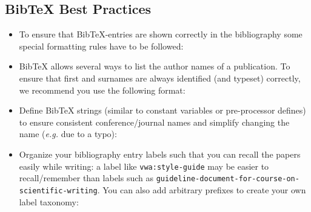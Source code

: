\documentclass[11pt,a4paper]{article}
\begin{document}

\subsection{BibTeX Best Practices}
\label{sec-bibtex-extras}


\begin{itemize}

\item To ensure that BibTeX-entries are shown correctly in the bibliography some
special formatting rules have to be followed:
\vspace{-0.6cm}

\item BibTeX allows several ways to list the author names of a publication.
To ensure that first and surnames are always identified (and typeset) correctly, we recommend you use the following format:
\vspace{-0.6cm}

\item Define BibTeX strings (similar to constant variables or pre-processor defines) to ensure consistent conference/journal names and simplify changing the name (\emph{e.g.} due to a typo):
%
\vspace{-0.6cm}

\item Organize your bibliography entry labels such that you can recall the papers easily while writing: a label like \texttt{vwa:style-guide} may be easier to recall/remember than labels such as \texttt{guideline-document-for-course-on-scientific-writing}. You can also add arbitrary prefixes to create your own label taxonomy:
%
\vspace{-0.4cm}

\end{itemize}
\end{document}
